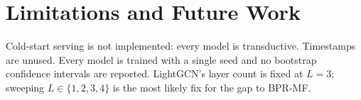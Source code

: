 \documentclass[sigconf,nonacm]{acmart}
\begin{document}
\section{Limitations and Future Work}
Cold-start serving is not implemented: every model is transductive.
Timestamps are unused. Every model is trained with a single seed and
no bootstrap confidence intervals are reported. LightGCN's layer
count is fixed at $L = 3$; sweeping $L \in \{1,2,3,4\}$ is the most
likely fix for the gap to BPR-MF.
\end{document}
